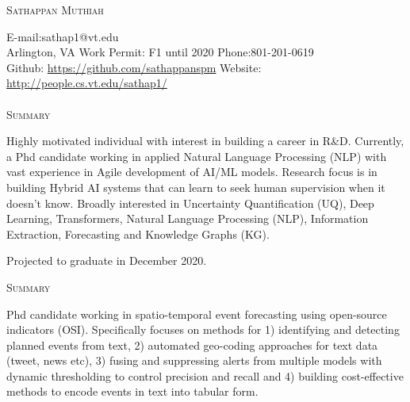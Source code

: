 \documentclass[a4paper]{article}
\newcommand{\lineunder} {\vspace*{-8pt} \\
    \hspace*{-18pt} \hrulefill \\
}
\newcommand{\header} [1] {{\hspace*{-18pt}\vspace*{6pt}\large {\textsc{#1}}}
    \vspace*{-6pt} %
}
\begin{document}

\vspace*{-35pt}

\begin{center}
	{\huge \scshape {Sathappan Muthiah}}\\
\end{center}
\small
E-mail:sathap1@vt.edu\\
Arlington, VA \hfill Work Permit: F1 until 2020 \hfill
Phone:801-201-0619 \\
Github: \url{https://github.com/sathappanspm} \hfill Website:
\url{http://people.cs.vt.edu/sathap1/}  \normalsize \lineunder

%

\header{Summary}

Highly motivated individual with interest in building a career in R\&D. 
Currently, a Phd candidate working in applied Natural Language Processing (NLP) with vast experience in Agile development of AI/ML models. Research focus is in building Hybrid AI systems that can learn to seek human supervision when it doesn't know. Broadly interested in Uncertainty Quantification (UQ), Deep Learning, Transformers, Natural Language Processing (NLP), Information Extraction, Forecasting and Knowledge Graphs (KG).


\vspace{0.5em}
Projected to graduate in December 2020.


\iffalse

\header{Summary}

Phd candidate working in spatio-temporal event forecasting using
open-source indicators (OSI). Specifically focuses on methods
for 1) identifying and
detecting planned events from text, 2) automated geo-coding approaches
for text data (tweet, news etc), 3) fusing and suppressing alerts from
multiple models with dynamic thresholding to control precision and
recall and 4) building cost-effective methods to encode events in text
into tabular form.  %
\end{document}
